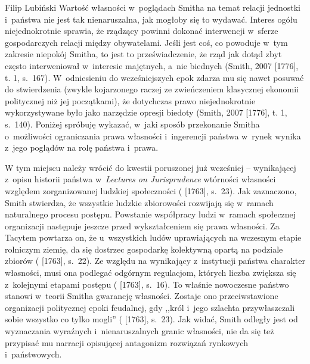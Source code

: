 \begin{artplenv}{Filip Lubiński}
Wartość własności w~poglądach Smitha na temat relacji jednostki i~państwa nie jest tak nienaruszalna, jak mogłoby
się to wydawać. Interes ogółu niejednokrotnie sprawia, że rządzący powinni dokonać interwencji w~sferze gospodarczych
relacji między obywatelami. Jeśli jest coś, co powoduje w~tym zakresie niepokój Smitha, to jest to przeświadczenie, że
rząd jak dotąd zbyt często interweniował w~interesie majętnych, a~nie biednych
\label{ref:RNDKTNonQx9Ln}(Smith, 2007 [1776], t. 1, s.~167).
W~odniesieniu do wcześniejszych epok zdarza mu się nawet posuwać do stwierdzenia (zwykle
kojarzonego raczej ze zwieńczeniem klasycznej ekonomii politycznej niż jej początkami), że dotychczas prawo
niejednokrotnie wykorzystywane było jako narzędzie opresji biedoty
\label{ref:RNDK2BdJNopfX}(Smith, 2007 [1776], t. 1, s.~140).
Poniżej spróbuję wykazać, w~jaki sposób przekonanie Smitha o~możliwości ograniczania
prawa własności i~ingerencji państwa w~rynek wynika z~jego poglądów na rolę państwa i~prawa.

W tym miejscu należy wrócić do kwestii poruszonej już wcześniej -- wynikającej z~opisu historii
państwa w~\textit{Lectures on Jurisprudence} wtórności własności względem zorganizowanej ludzkiej społeczności
(\cite{smith_lectures_1982} [1763], s.~23).
Jak zaznaczono, Smith stwierdza, że wszystkie ludzkie
zbiorowości rozwijają się w~ramach naturalnego procesu postępu. Powstanie współpracy ludzi w~ramach społecznej
organizacji następuje jeszcze przed wykształceniem się prawa własności. Za Tacytem powtarza on, że u~wszystkich ludów
uprawiających na wczesnym etapie rolniczym ziemię, da się dostrzec gospodarkę kolektywną opartą na podziale zbiorów
(\cite{smith_lectures_1982} [1763], s.~22).
Ze względu na wynikający z~instytucji państwa charakter
własności, musi ona podlegać odgórnym regulacjom, których liczba zwiększa się z~kolejnymi etapami postępu
(\cite{smith_lectures_1982} [1763], s.~16).
To właśnie nowoczesne państwo stanowi w~teorii Smitha gwarancję
własności. Zostaje ono przeciwstawione organizacji politycznej epoki feudalnej, gdy ,,król i~jego szlachta
przywłaszczali sobie wszystko co tylko mogli''
(\cite{smith_lectures_1982} [1763], s.~23).
Jak widać, Smith
odległy jest od wyznaczania wyraźnych i~nienaruszalnych granic własności, nie da się też przypisać mu narracji
opisującej antagonizm rozwiązań rynkowych i~państwowych.


\end{artplenv}
